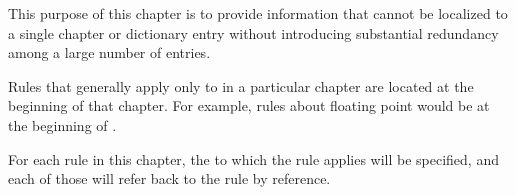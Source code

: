 
This purpose of this chapter is to provide information that cannot be
localized to a single chapter or dictionary entry without introducing
substantial redundancy among a large number of entries.

Rules that generally apply only to  in a particular
chapter are located at the beginning of that chapter.  For example, 
rules about floating point  would be at the beginning of 
\chapref\Numbers.

For each rule in this chapter, the  to which the
rule applies will be specified, and each of those 
will refer back to the rule by reference.
